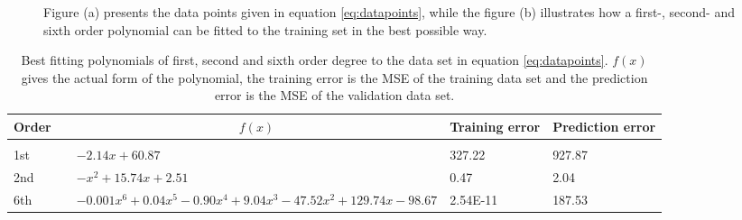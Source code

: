 \begin{figure}[H]
	\centering
	\caption{Figure (a) presents the data points given in equation \eqref{eq:datapoints}, while the figure (b) illustrates how a first-, second- and sixth order polynomial can be fitted to the training set in the best possible way.}%
	\label{fig:polynomials}
\end{figure}

\begin{table}[H]
	\caption{Best fitting polynomials of first, second and sixth order degree to the data set in equation \eqref{eq:datapoints}. $f(x)$ gives the actual form of the polynomial, the training error is the MSE of the training data set and the prediction error is the MSE of the validation data set.}
	\label{tab:example}
	\begin{tabularx}{\textwidth}{llR{6.5cm}R{3cm}R{3cm}} \hline\hline
		Order & \makecell{\\ \phantom{=}} &  & Training error & Prediction error \\ \hline \\
		
		1st && $-2.14x+60.87$ & 327.22 & 927.87 \\
		2nd && $-x^2+15.74x + 2.51$ & 0.47 & 2.04 \\
		6th && $-0.001x^6+0.04x^5-0.90x^4+9.04x^3-47.52x^2+129.74x-98.67$ & 2.54E-11 & 187.53 \\ \hline\hline
	\end{tabularx}
\end{table}

